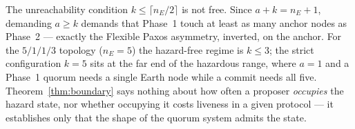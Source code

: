 \begin{remark}
The unreachability condition $k\le\lceil n_E/2\rceil$ is not free.  Since
$a+k=n_E+1$, demanding $a\ge k$ demands that Phase~1 touch at least as many
anchor nodes as Phase~2 --- exactly the Flexible Paxos asymmetry, inverted, on
the anchor.  For the $5/1/1/3$ topology ($n_E=5$) the hazard-free regime is
$k\le3$; the strict configuration $k=5$ sits at the far end of the hazardous
range, where $a=1$ and a Phase~1 quorum needs a single Earth node while a
commit needs all five.  Theorem~\ref{thm:boundary} says nothing about how
often a proposer \emph{occupies} the hazard state, nor whether occupying it
costs liveness in a given protocol --- it establishes only that the shape of
the quorum system admits the state.
\end{remark}
